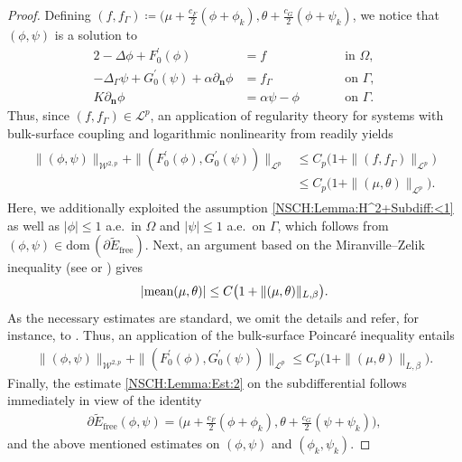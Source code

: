 \documentclass[11pt,reqno]{amsart}
\theoremstyle{remark}
\numberwithin{equation}{section}
\newcommand{\abs}[1]{|#1|}
\newcommand{\norm}[1]{\| #1 \|}
\newcommand{\mean}[2]{\textnormal{mean}(#1,#2)}
\newcommand{\n}{\mathbf{n}}
\newcommand{\del}{\partial}
\newcommand{\deln}{\partial_\n}
\newcommand{\Lap}{\Delta}
\newcommand{\Lapg}{\Delta_\Ga}
\newcommand{\Om}{\Omega}
\newcommand{\Ga}{\Gamma}
\newcommand{\free}{\mathrm{free}}
\begin{document}
\begin{proof}
	Defining $(f,f_\Ga) \coloneqq (\mu + \frac{c_F}{2}(\phi + \phi_k), \theta + \frac{c_G}{2}(\phi + \psi_k)$, we notice that $(\phi,\psi)$ is a solution to
	\begin{alignat*}{2}
		-\Lap\phi + F_0^\prime(\phi) &= f &&\qquad\text{in~}\Om, \\
		-\Lapg\psi + G_0^\prime(\psi) + \alpha\deln\phi &= f_\Ga &&\qquad\text{on~}\Ga, \\
		K\deln\phi &= \alpha\psi - \phi &&\qquad\text{on~}\Ga.
	\end{alignat*}
	Thus, since $(f,f_\Ga)\in\mathcal{L}^p$, an application of regularity theory for systems with bulk-surface coupling and logarithmic nonlinearity from \cite[Proposition~5.1]{Giorgini2026} readily yields
	\begin{align*}
		\begin{split}
			\norm{(\phi,\psi)}_{\mathcal{W}^{2,p}} + \norm{(F_0^\prime(\phi),G_0^\prime(\psi))}_{\mathcal{L}^p} &\leq C_p\big(1 + \norm{(f,f_\Ga)}_{\mathcal{L}^p}\big) \\
			&\leq C_p\big(1 + \norm{(\mu,\theta)}_{\mathcal{L}^p}\big).
		\end{split}
	\end{align*}
	Here, we additionally exploited the assumption \eqref{NSCH:Lemma:H^2+Subdiff:<1} as well as $\abs{\phi}\leq 1$ a.e.~in $\Om$ and $\abs{\psi} \leq 1$ a.e.~on $\Ga$, which follows from $(\phi,\psi)\in\mathrm{dom}\,(\partial\widetilde E_\free)$. Next, an argument based on the Miranville--Zelik inequality (see \cite[Appendix A.1]{Miranville2004} or \cite[p.~908]{Gilardi2009}) gives
	\begin{align*}
		\abs{\mean{\mu}{\theta}} \leq C\big(1 + \norm{(\mu,\theta)}_{L,\beta}\big).
	\end{align*}
    As the necessary estimates are standard, we omit the details and refer, for instance, to \cite[Proof of Theorem~3.4, Step~4]{Knopf2025}. Thus, an application of the bulk-surface Poincar\'{e} inequality entails
	\begin{align*}
		\norm{(\phi,\psi)}_{\mathcal{W}^{2,p}} + \norm{(F_0^\prime(\phi),G_0^\prime(\psi))}_{\mathcal{L}^p} \leq C_p\big(1 + \norm{(\mu,\theta)}_{L,\beta}\big).
	\end{align*}
	Finally, the estimate \eqref{NSCH:Lemma:Est:2} on the subdifferential follows immediately in view of the identity
	\begin{align*}
		\del 	\widetilde E_\free(\phi,\psi) = \Big(\mu + \frac{c_F}{2}(\phi + \phi_k), \theta + \frac{c_G}{2}(\psi + \psi_k)\Big),
	\end{align*}
	and the above mentioned estimates on $(\phi,\psi)$ and $(\phi_k,\psi_k)$.
\end{proof}
\end{document}
